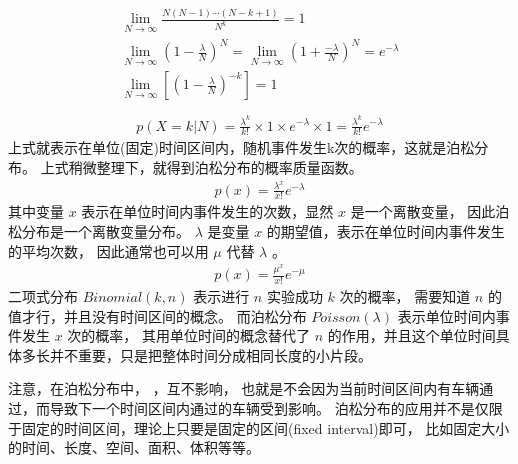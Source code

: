 \documentclass[letterpaper,10pt,english]{sphinxmanual}
\begin{document}
\begin{align}\label{equation:泊松模型/content:eq_poisson_214}\!\begin{aligned}
\lim_{N \to \infty}  \frac{N (N-1) \cdots  (N-k+1)}{N^k} = 1\\
\lim_{N \to \infty}  \left ( 1-\frac{\lambda}{N} \right )^N =
\lim_{N \to \infty}  \left ( 1+\frac{-\lambda}{N} \right )^N = e^{-\lambda}\\
\lim_{N \to \infty}\left [  \left ( 1-\frac{\lambda}{N} \right )^{-k}\right ] = 1\\
\end{aligned}\end{align}\begin{equation}\label{equation:泊松模型/content:eq_poisson_215}
\begin{split}p(X=k|N) = \frac{\lambda^k}{k!} \times 1 \times  e^{-\lambda} \times 1
    =\frac{\lambda^k}{k!}  e^{-\lambda}\end{split}
\end{equation}
上式就表示在单位(固定)时间区间内，随机事件发生k次的概率，这就是泊松分布。
上式稍微整理下，就得到泊松分布的概率质量函数。
\begin{equation}\label{equation:泊松模型/content:eq_poisson_216}
\begin{split}p(x) = \frac{\lambda^x}{x!}  e^{-\lambda}\end{split}
\end{equation}
其中变量 \(x\) 表示在单位时间内事件发生的次数，显然 \(x\) 是一个离散变量，
因此泊松分布是一个离散变量分布。
\(\lambda\) 是变量 \(x\) 的期望值，表示在单位时间内事件发生的平均次数，
因此通常也可以用 \(\mu\) 代替 \(\lambda\) 。
\begin{equation}\label{equation:泊松模型/content:eq_poisson_217}
\begin{split}p(x) = \frac{\mu^x}{x!}  e^{-\mu}\end{split}
\end{equation}
二项式分布 \(Binomial(k,n)\) 表示进行 \(n\) 实验成功 \(k\) 次的概率，
需要知道 \(n\) 的值才行，并且没有时间区间的概念。
而泊松分布 \(Poisson(\lambda)\) 表示单位时间内事件发生 \(x\) 次的概率，
其用单位时间的概念替代了 \(n\) 的作用，并且这个单位时间具体多长并不重要，只是把整体时间分成相同长度的小片段。

注意，在泊松分布中， ，互不影响，
也就是不会因为当前时间区间内有车辆通过，而导致下一个时间区间内通过的车辆受到影响。
泊松分布的应用并不是仅限于固定的时间区间，理论上只要是固定的区间(fixed interval)即可，
比如固定大小的时间、长度、空间、面积、体积等等。
\end{document}
